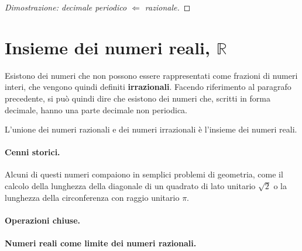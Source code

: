 \begin{proof}[Dimostrazione: decimale periodico $\Leftarrow$ razionale]
\end{proof}

\section{Insieme dei numeri reali, $\mathbb{R}$}

Esistono dei numeri che non possono essere rappresentati come frazioni di numeri interi, che vengono quindi definiti \textbf{irrazionali}. Facendo riferimento al paragrafo precedente, si può quindi dire che esistono dei numeri che, scritti in forma decimale, hanno una parte decimale non periodica.

\begin{definition}
L'unione dei numeri razionali e dei numeri irrazionali è l'insieme dei numeri reali.
\end{definition}

\paragraph{Cenni storici.} Alcuni di questi numeri compaiono in semplici problemi di geometria, come il calcolo della lunghezza della diagonale di un quadrato di lato unitario  $\sqrt{2}$ o la lunghezza della circonferenza con raggio unitario $\pi$.

{\color{red}
\paragraph{Operazioni chiuse.}
\paragraph{Numeri reali come limite dei numeri razionali.}
}

